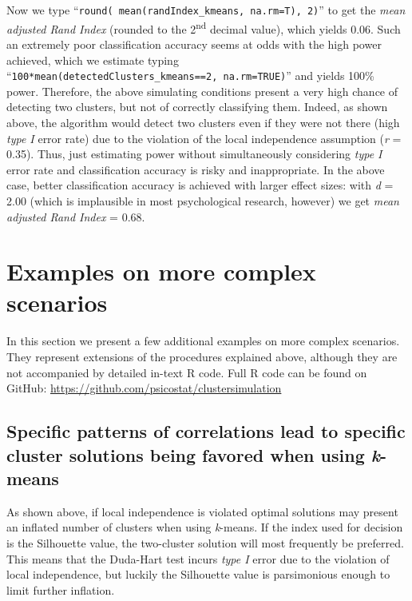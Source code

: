 \documentclass[
  man,floatsintext]{apa7}
\begin{document}
Now we type ``\texttt{round(\ mean(randIndex\_kmeans,\ na.rm=T),\ 2)}'' to get the \emph{mean adjusted Rand Index} (rounded to the 2\textsuperscript{nd} decimal value), which yields 0.06. Such an extremely poor classification accuracy seems at odds with the high power achieved, which we estimate typing ``\texttt{100*mean(detectedClusters\_kmeans==2,\ na.rm=TRUE)}'' and yields 100\% power. Therefore, the above simulating conditions present a very high chance of detecting two clusters, but not of correctly classifying them. Indeed, as shown above, the algorithm would detect two clusters even if they were not there (high \emph{type I} error rate) due to the violation of the local independence assumption (\emph{r} = 0.35). Thus, just estimating power without simultaneously considering \emph{type I} error rate and classification accuracy is risky and inappropriate. In the above case, better classification accuracy is achieved with larger effect sizes: with \emph{d} = 2.00 (which is implausible in most psychological research, however) we get \emph{mean adjusted Rand Index} = 0.68.

\hypertarget{examples-on-more-complex-scenarios}{%
\section{Examples on more complex scenarios}\label{examples-on-more-complex-scenarios}}

In this section we present a few additional examples on more complex scenarios. They represent extensions of the procedures explained above, although they are not accompanied by detailed in-text R code. Full R code can be found on GitHub: \url{https://github.com/psicostat/clustersimulation}

\hypertarget{specific-patterns-of-correlations-lead-to-specific-cluster-solutions-being-favored-when-using-k-means}{%
\subsection{\texorpdfstring{Specific patterns of correlations lead to specific cluster solutions being favored when using \emph{k}-means}{Specific patterns of correlations lead to specific cluster solutions being favored when using k-means}}\label{specific-patterns-of-correlations-lead-to-specific-cluster-solutions-being-favored-when-using-k-means}}

As shown above, if local independence is violated optimal solutions may present an inflated number of clusters when using \emph{k}-means. If the index used for decision is the Silhouette value, the two-cluster solution will most frequently be preferred. This means that the Duda-Hart test incurs \emph{type I} error due to the violation of local independence, but luckily the Silhouette value is parsimonious enough to limit further inflation.
\end{document}
